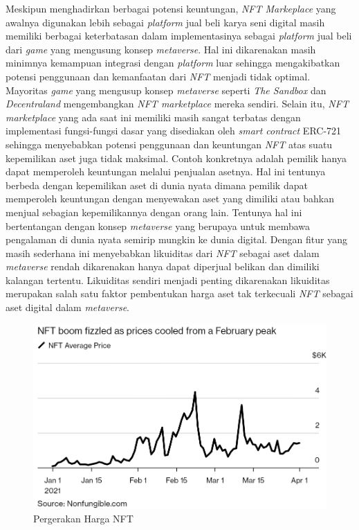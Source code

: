 Meskipun menghadirkan berbagai potensi keuntungan, \emph{NFT Markeplace} yang awalnya digunakan lebih sebagai \emph{platform} jual beli karya seni digital masih memiliki berbagai keterbatasan dalam implementasinya sebagai \emph{platform} jual beli dari \emph{game} yang mengusung konsep \emph{metaverse}. Hal ini dikarenakan masih minimnya kemampuan integrasi dengan \emph{platform} luar sehingga mengakibatkan potensi penggunaan dan kemanfaatan dari \emph{NFT} menjadi tidak optimal. Mayoritas \emph{game} yang mengusup konsep \emph{metaverse} seperti \emph{The Sandbox} dan \emph{Decentraland} mengembangkan \emph{NFT marketplace} mereka sendiri. 
Selain itu, \emph{NFT marketplace} yang ada saat ini memiliki masih sangat terbatas dengan implementasi fungsi-fungsi dasar yang disediakan oleh \emph{smart contract} ERC-721 sehingga menyebabkan potensi penggunaan dan keuntungan \emph{NFT} atas suatu kepemilikan aset juga tidak maksimal. Contoh konkretnya adalah pemilik hanya dapat memperoleh keuntungan melalui penjualan asetnya. 
Hal ini tentunya berbeda dengan kepemilikan aset di dunia nyata dimana pemilik dapat memperoleh keuntungan dengan menyewakan aset yang dimiliki atau bahkan menjual sebagian kepemilikannya dengan orang lain.
Tentunya hal ini bertentangan dengan konsep \emph{metaverse} yang berupaya untuk membawa pengalaman di dunia nyata semirip mungkin ke dunia digital. 
Dengan fitur yang masih sederhana ini menyebabkan likuiditas dari \emph{NFT} sebagai aset dalam \emph{metaverse} rendah dikarenakan hanya dapat diperjual belikan dan dimiliki kalangan tertentu. 
Likuiditas sendiri menjadi penting dikarenakan likuiditas merupakan salah satu faktor pembentukan harga aset tak terkecuali \emph{NFT} sebagai aset digital dalam \emph{metaverse}.  

\begin{figure} [H] \centering
  \includegraphics[scale=0.45]{gambar/img-nft-price-history.png}
  \caption{Pergerakan Harga NFT}
  \label{fig:Architecture}
\end{figure}

